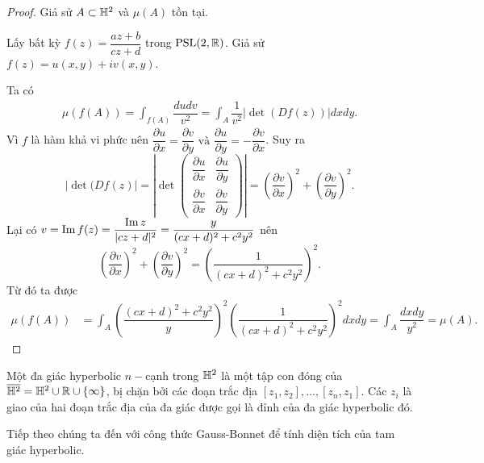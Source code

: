\begin{proof}
    Giả sử $A \subset \mathbb{H}^2$ và $\mu(A)$ tồn tại. 
    
    Lấy bất kỳ $f(z) = \dfrac{az+b}{cz+d} $ trong $\operatorname{PSL}(2,\mathbb{R})$. Giả sử $f(z) = u(x,y)+iv(x,y)$. 
    
    Ta có
    \begin{align*}
        \mu(f(A)) = \int_{f(A)}\dfrac{dudv}{v^2}= \int_A{\dfrac{1}{v^2} |\det(Df(z))|dxdy}.
    \end{align*}
     Vì $f$ là hàm khả vi phức nên $\dfrac{\partial u}{\partial x} = \dfrac{\partial v}{\partial y} \text{ và } \dfrac{\partial u}{\partial y} = -\dfrac{\partial v}{\partial x}$. Suy ra 
     \[\left|\det(Df(z)\right| = \left|\det \begin{pmatrix}
                \dfrac{\partial u}{\partial x} & \dfrac{\partial u}{\partial y} \\
                 \dfrac{\partial v}{\partial x}& \dfrac{\partial v}{\partial y}
    \end{pmatrix}\right| = \left(\dfrac{\partial v}{\partial x}\right)^2 + \left(\dfrac{\partial v}{\partial y}\right)^2.\]
    Lại có $v = \operatorname{Im} f(z) = \dfrac{\operatorname{Im} z}{|cz+d|^2} = \dfrac{y}{(cx+d)^2 + c^2y^2}$ nên 
    \[\left(\dfrac{\partial v}{\partial x}\right)^2 + \left(\dfrac{\partial v}{\partial y}\right)^2 = \left(\dfrac{1}{(cx+d)^2 + c^2y^2}\right)^2.\]
    Từ đó ta được 
    \begin{align*}
        \mu(f(A)) 
        &= \int_A{\left(\dfrac{(cx+d)^2 + c^2y^2}{y}\right)^2 \left(\dfrac{1}{(cx+d)^2 + c^2y^2}\right)^2dxdy}
        = \int_A\dfrac{dxdy}{y^2} = \mu(A).
    \end{align*}
\end{proof}
\begin{defn}
    Một đa giác hyperbolic $n-$cạnh trong $\mathbb{H}^2$ là một tập con đóng của $\overline{\mathbb{H}^2} = \mathbb{H}^2 \cup \mathbb{R} \cup \{\infty\}$, bị chặn bởi các đoạn trắc địa $[z_1,z_2],\ldots,[z_n,z_1]$. Các $z_i$ là giao của hai đoạn trắc địa của đa giác được gọi là đỉnh của đa giác hyperbolic đó.
\end{defn}
Tiếp theo chúng ta đến với công thức Gauss-Bonnet để tính diện tích của tam giác hyperbolic.
